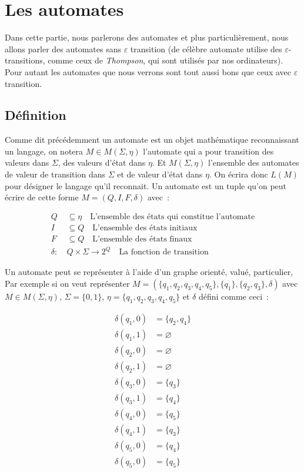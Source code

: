 \section{Les automates}

Dans cette partie, nous parlerons des automates et plus particulièrement, nous
allons parler des automates sans \(\varepsilon\) transition (de célèbre
automate utilise des \(\varepsilon\)-transitions, comme ceux de
\textit{Thompson}, qui sont utilisés par nos ordinateurs). Pour autant les
automates que nous verrons sont tout aussi bons que ceux avec \(\varepsilon\)
transition.

\subsection{Définition}

Comme dit précédemment un automate est un objet mathématique reconnaissant un
langage, on notera \(M \in M(\Sigma, \eta)\) l'automate qui a pour transition
des valeurs dans \(\Sigma\), des valeurs \og{}d'état\fg{} dans \(\eta\). Et
\(M(\Sigma, \eta)\) l'ensemble des automates de valeur de transition dans
\(\Sigma\) et de valeur d'état dans \(\eta\). On écrira donc \(L(M)\) pour
désigner le langage qu'il reconnait. Un automate est un tuple qu'on peut écrire
de cette forme \(M = (Q, I, F, \delta)\) avec~:

\begin{align}
    Q        & \subseteq \eta \quad \text{L'ensemble des états qui constitue l'automate} \\
    I        & \subseteq Q \quad \text{L'ensemble des états initiaux}                    \\
    F        & \subseteq Q \quad \text{L'ensemble des états finaux}                      \\
    \delta:~ & Q \times \Sigma \to 2^Q \quad \text{La fonction de transition}
\end{align}

Un automate peut se représenter à l'aide d'un graphe orienté, valué,
particulier, Par exemple si on veut représenter \(M = (\{q_1, q_2, q_3, q_4,
q_5\}, \{q_1\},\{q_2, q_3\}, \delta)\) avec \(M \in M(\Sigma, \eta)\), \(\Sigma
= \{0, 1\}\), \(\eta = \{q_1, q_2, q_3, q_4, q_5\}\) et \(\delta\) défini comme
ceci~:

\begin{align*}
    \delta(q_1, 0) & = \{q_2, q_4\} \\
    \delta(q_1, 1) & = \varnothing  \\
    \delta(q_2, 0) & = \varnothing  \\
    \delta(q_2, 1) & = \varnothing  \\
    \delta(q_3, 0) & = \{q_3\}      \\
    \delta(q_3, 1) & = \{q_4\}      \\
    \delta(q_4, 0) & = \{q_5\}      \\
    \delta(q_4, 1) & = \{q_3\}      \\
    \delta(q_5, 0) & = \{q_4\}      \\
    \delta(q_5, 0) & = \{q_5\}      \\
\end{align*}

